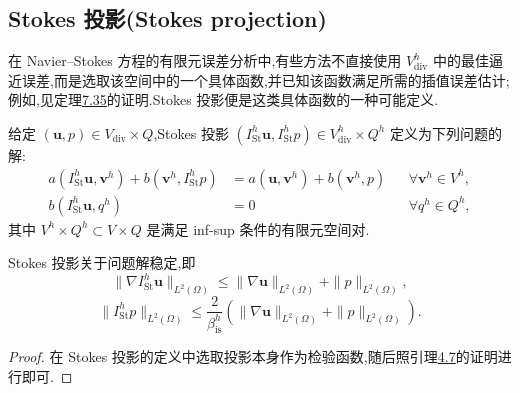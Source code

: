 \subsection{\texorpdfstring{Stokes 投影(Stokes projection)}{Stokes 投影}}\label{sec:stokes-projection}

\begin{note}[Stokes 投影]\label{note:stokes-projection}
在 Navier--Stokes 方程的有限元误差分析中,有些方法不直接使用 $V_{\mathrm{div}}^h$ 中的最佳逼近误差,而是选取该空间中的一个具体函数,并已知该函数满足所需的插值误差估计;例如,见定理\hyperref[thm:navier-stokes-error-estimate]{7.35}的证明.Stokes 投影便是这类具体函数的一种可能定义.

给定 $(\bm{u},p)\in V_{\mathrm{div}}\times Q$,Stokes 投影 $(I_{\mathrm{St}}^h\bm{u},I_{\mathrm{St}}^hp)\in V_{\mathrm{div}}^h\times Q^h$ 定义为下列问题的解:
\begin{equation}\label{eq:stokes-projection-definition}
\begin{aligned}
  a(I_{\mathrm{St}}^h\bm{u},\bm{v}^h)
  +b(\bm{v}^h,I_{\mathrm{St}}^hp)
  &=a(\bm{u},\bm{v}^h)+b(\bm{v}^h,p)
  &&\forall\bm{v}^h\in V^h,\\
  b(I_{\mathrm{St}}^h\bm{u},q^h)&=0
  &&\forall q^h\in Q^h,
\end{aligned}
\end{equation}
其中 $V^h\times Q^h\subset V\times Q$ 是满足 inf-sup 条件的有限元空间对.
\end{note}

\begin{lemma}\label{lem:stokes-projection-stability}
Stokes 投影关于问题解稳定,即
\begin{equation}\label{eq:stokes-projection-stability-velocity}
  \|\nabla I_{\mathrm{St}}^h\bm{u}\|_{L^2(\Omega)}
  \leq \|\nabla\bm{u}\|_{L^2(\Omega)}
       +\|p\|_{L^2(\Omega)},
\end{equation}
\begin{equation}\label{eq:stokes-projection-stability-pressure}
  \|I_{\mathrm{St}}^hp\|_{L^2(\Omega)}
  \leq \frac{2}{\beta_{\mathrm{is}}^h}
       \left(\|\nabla\bm{u}\|_{L^2(\Omega)}
             +\|p\|_{L^2(\Omega)}\right).
\end{equation}
\end{lemma}
\begin{proof}
在 Stokes 投影的定义中选取投影本身作为检验函数,随后照引理\hyperref[lem:stokes-stability]{4.7}的证明进行即可.
\end{proof}

